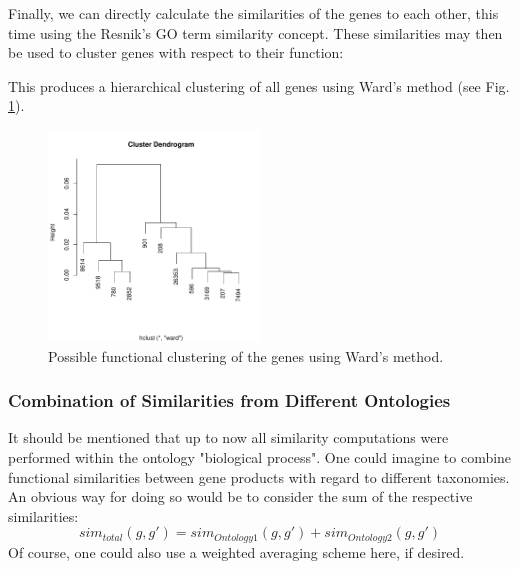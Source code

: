 \documentclass[12pt,a4paper]{article}
\begin{document}
Finally, we can directly calculate the similarities of the genes to each other, this time using the Resnik's GO term similarity concept. These similarities may then be used to cluster genes with respect to their function:
\begin{Schunk}
\end{Schunk}

This produces a hierarchical clustering of all genes using Ward's method (see Fig. \ref{Fig:GOCluster}).

\begin{figure}
\begin{center}
\includegraphics[width=0.5\textwidth]{GOClusterExample.pdf}
\caption{\label{Fig:GOCluster}Possible functional clustering of the genes using Ward's method.}
\end{center}
\end{figure}



\subsubsection{Combination of Similarities from Different Ontologies}

It should be mentioned that up to now all similarity computations were performed within the ontology "biological process". One could imagine to combine functional similarities between gene products with regard to different taxonomies. An obvious way for doing so would be to consider the sum of the respective similarities:
\begin{equation}
sim_{total}(g,g') = sim_{Ontology1}(g,g') + sim_{Ontology2}(g,g')
\end{equation}
Of course, one could also use a weighted averaging scheme here, if desired.
\end{document}
